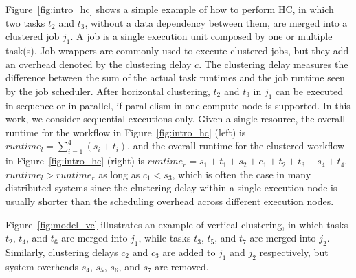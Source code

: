 Figure~\ref{fig:intro_hc} shows a simple example of how to perform HC, in which two tasks $t_2$ and $t_3$, without a data dependency between them, are merged into a clustered job $j_1$. A job is a single execution unit composed by one or multiple task(s). Job wrappers are commonly used to execute clustered jobs, but they add an overhead denoted by the clustering delay $c$. The clustering delay measures the difference between the sum of the actual task runtimes and the job runtime seen by the job scheduler. 
After horizontal clustering, $t_2$ and $t_3$ in $j_1$ can be executed in sequence or in parallel, if parallelism in one compute node is supported. In this work, we consider sequential executions only. Given a single resource, the overall runtime for the workflow in Figure~\ref{fig:intro_hc} (left) is $runtime_l= \sum_{i=1}^{4}(s_i+t_i)$, and the overall runtime for the clustered workflow in Figure~\ref{fig:intro_hc} (right) is $runtime_r=s_1+t_1+s_2+c_1+t_2+t_3+s_4+t_4$.  $runtime_l > runtime_r$ as long as $c_1 < s_3$, which is often the case in many distributed systems since the clustering delay within a single execution node is usually shorter than the scheduling overhead across different execution nodes. 


Figure~\ref{fig:model_vc} illustrates an example of vertical clustering, in which tasks $t_2$, $t_4$, and $t_6$ are merged into $j_1$, while tasks $t_3$, $t_5$, and $t_7$ are merged into $j_2$. Similarly, clustering delays $c_2$ and $c_3$ are added to $j_1$ and $j_2$ respectively, but system overheads $s_4$, $s_5$, $s_6$, and $s_7$ are removed. 






